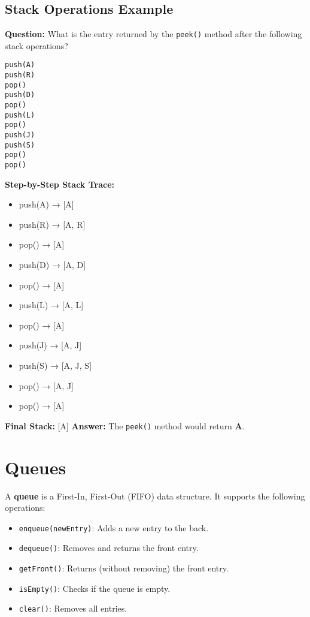 \documentclass[11pt]{article}
\begin{document}
\subsection*{Stack Operations Example}

\textbf{Question:}  
What is the entry returned by the \texttt{peek()} method after the following stack operations?

\begin{verbatim}
push(A)
push(R)
pop()
push(D)
pop()
push(L)
pop()
push(J)
push(S)
pop()
pop()
\end{verbatim}

\textbf{Step-by-Step Stack Trace:}
\begin{itemize}
  \item push(A) → [A]
  \item push(R) → [A, R]
  \item pop()   → [A]
  \item push(D) → [A, D]
  \item pop()   → [A]
  \item push(L) → [A, L]
  \item pop()   → [A]
  \item push(J) → [A, J]
  \item push(S) → [A, J, S]
  \item pop()   → [A, J]
  \item pop()   → [A]
\end{itemize}

\textbf{Final Stack:} [A]  
\textbf{Answer:} The \texttt{peek()} method would return \textbf{A}.

\hrulefill

\section*{Queues}

A \textbf{queue} is a First-In, First-Out (FIFO) data structure. It supports the following operations:

\begin{itemize}
  \item \texttt{enqueue(newEntry)}: Adds a new entry to the back.
  \item \texttt{dequeue()}: Removes and returns the front entry.
  \item \texttt{getFront()}: Returns (without removing) the front entry.
  \item \texttt{isEmpty()}: Checks if the queue is empty.
  \item \texttt{clear()}: Removes all entries.
\end{itemize}
\end{document}
